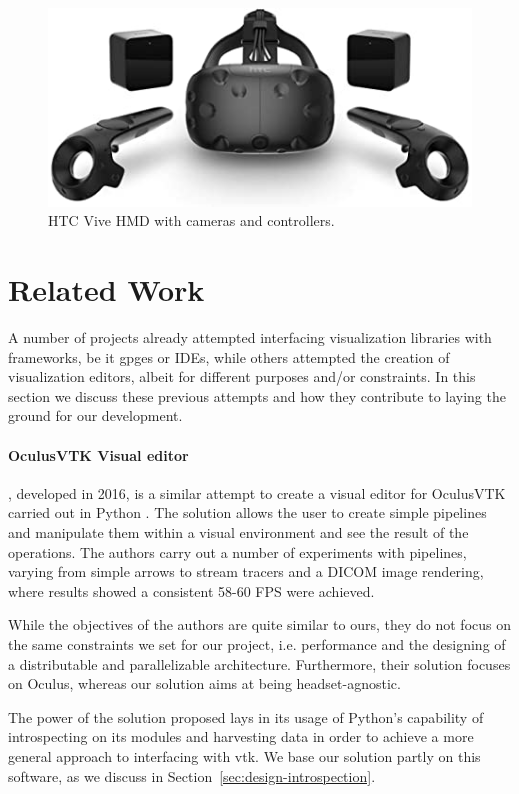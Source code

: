\begin{figure}[t]
    \centering
    \includegraphics[width=.7\textwidth]{pictures/htc_vive.jpg}
    \caption{HTC Vive HMD with cameras and controllers.}
    \label{fig:htc-vive}
\end{figure}

\section{Related Work}
\label{sec:related-work}

A number of projects already attempted interfacing visualization libraries with frameworks, be it \acrshort{gpge}s or IDEs, while others attempted the creation of visualization editors, albeit for different purposes and/or constraints. In this section we discuss these previous attempts and how they contribute to laying the ground for our development.

\paragraph{OculusVTK Visual editor}

, developed in 2016, is a similar attempt to create a visual editor for OculusVTK carried out in Python \cite{dreuning_visual_2016}. The solution allows the user to create simple pipelines and manipulate them within a visual environment and see the result of the operations. The authors carry out a number of experiments with pipelines, varying from simple arrows to stream tracers and a DICOM image rendering, where results showed a consistent 58-60 FPS were achieved.

While the objectives of the authors are quite similar to ours, they do not focus on the same constraints we set for our project, i.e. performance and the designing of a distributable and parallelizable architecture. Furthermore, their solution focuses on Oculus, whereas our solution aims at being headset-agnostic.

The power of the solution proposed lays in its usage of Python's capability of introspecting on its modules and harvesting data in order to achieve a more general approach to interfacing with \acrshort{vtk}. We base our solution partly on this software, as we discuss in Section~\ref{sec:design-introspection}.

